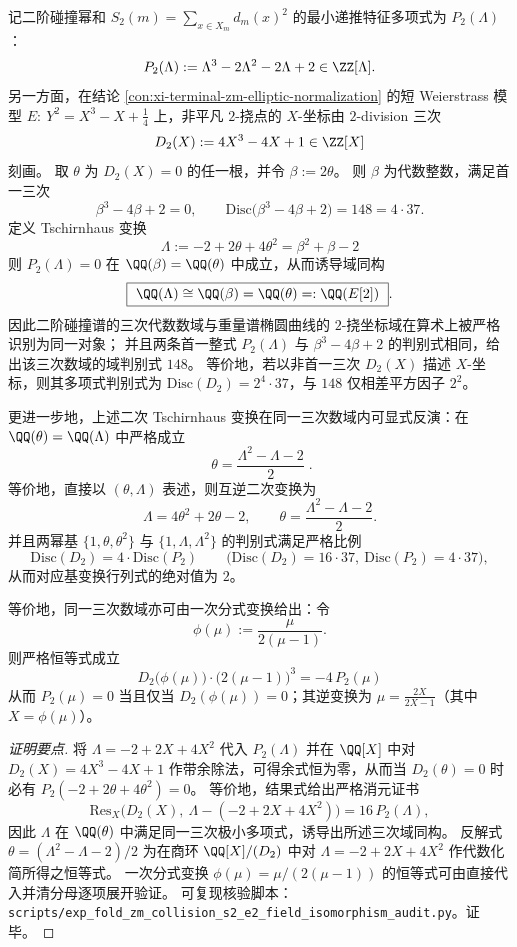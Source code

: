 \begin{conclusion}\label{con:xi-terminal-zm-collision-s2-e2-field-isomorphism}
记二阶碰撞幂和 \(S_2(m)=\sum_{x\in X_m}d_m(x)^2\) 的最小递推特征多项式为 \(P_2(\Lambda)\)：
\[
P_2(\Lambda):=\Lambda^3-2\Lambda^2-2\Lambda+2\in\ZZ[\Lambda].
\]
另一方面，在结论 \ref{con:xi-terminal-zm-elliptic-normalization} 的短 Weierstrass 模型
\(
E:\ Y^2=X^3-X+\tfrac14
\)
上，非平凡 \(2\)-挠点的 \(X\)-坐标由 \(2\)-division 三次
\[
D_2(X):=4X^3-4X+1\in\ZZ[X]
\]
刻画。
取 \(\theta\) 为 \(D_2(X)=0\) 的任一根，并令 \(\beta:=2\theta\)。
则 \(\beta\) 为代数整数，满足首一三次
\[
\beta^3-4\beta+2=0,
\qquad
\mathrm{Disc}\bigl(\beta^3-4\beta+2\bigr)=148=4\cdot 37.
\]
定义 Tschirnhaus 变换
\[
\boxed{\;\Lambda:=-2+2\theta+4\theta^2=\beta^2+\beta-2\;}
\]
则 \(P_2(\Lambda)=0\) 在 \(\QQ(\beta)=\QQ(\theta)\) 中成立，从而诱导域同构
\[
\boxed{\ \QQ(\Lambda)\cong \QQ(\beta)=\QQ(\theta)=:\QQ(E[2])\ }.
\]
因此二阶碰撞谱的三次代数数域与重量谱椭圆曲线的 \(2\)-挠坐标域在算术上被严格识别为同一对象；
并且两条首一整式 \(P_2(\Lambda)\) 与 \(\beta^3-4\beta+2\) 的判别式相同，给出该三次数域的域判别式 \(148\)。
等价地，若以非首一三次 \(D_2(X)\) 描述 \(X\)-坐标，则其多项式判别式为 \(\mathrm{Disc}(D_2)=2^{4}\cdot 37\)，与 \(148\) 仅相差平方因子 \(2^{2}\)。
\par
更进一步地，上述二次 Tschirnhaus 变换在同一三次数域内可显式反演：在 \(\QQ(\theta)=\QQ(\Lambda)\) 中严格成立
\[
\boxed{\;\theta=\frac{\Lambda^{2}-\Lambda-2}{2}\; }.
\]
等价地，直接以 \((\theta,\Lambda)\) 表述，则互逆二次变换为
\[
\Lambda=4\theta^{2}+2\theta-2,
\qquad
\theta=\frac{\Lambda^{2}-\Lambda-2}{2}.
\]
并且两幂基 \(\{1,\theta,\theta^{2}\}\) 与 \(\{1,\Lambda,\Lambda^{2}\}\) 的判别式满足严格比例
\[
\mathrm{Disc}(D_2)=4\cdot \mathrm{Disc}(P_2)
\qquad
\bigl(\mathrm{Disc}(D_2)=16\cdot 37,\ \mathrm{Disc}(P_2)=4\cdot 37\bigr),
\]
从而对应基变换行列式的绝对值为 \(2\)。
\par
等价地，同一三次数域亦可由一次分式变换给出：令
\[
\phi(\mu):=\frac{\mu}{2(\mu-1)}.
\]
则严格恒等式成立
\[
\boxed{\;D_2\bigl(\phi(\mu)\bigr)\cdot\bigl(2(\mu-1)\bigr)^3=-4\,P_2(\mu)\;}
\]
从而 \(P_2(\mu)=0\) 当且仅当 \(D_2(\phi(\mu))=0\)；其逆变换为 \(\mu=\frac{2X}{2X-1}\)（其中 \(X=\phi(\mu)\)）。
\end{conclusion}
\begin{proof}[证明要点]
将 \(\Lambda=-2+2X+4X^2\) 代入 \(P_2(\Lambda)\) 并在 \(\QQ[X]\) 中对 \(D_2(X)=4X^3-4X+1\) 作带余除法，可得余式恒为零，从而当 \(D_2(\theta)=0\) 时必有 \(P_2(-2+2\theta+4\theta^2)=0\)。
等价地，结果式给出严格消元证书
\[
\mathrm{Res}_X\!\bigl(D_2(X),\ \Lambda-(-2+2X+4X^2)\bigr)=16\,P_2(\Lambda),
\]
因此 \(\Lambda\) 在 \(\QQ(\theta)\) 中满足同一三次极小多项式，诱导出所述三次域同构。
反解式 \(\theta=(\Lambda^{2}-\Lambda-2)/2\) 为在商环 \(\QQ[X]/(D_2)\) 中对 \(\Lambda=-2+2X+4X^2\) 作代数化简所得之恒等式。
一次分式变换 \(\phi(\mu)=\mu/(2(\mu-1))\) 的恒等式可由直接代入并清分母逐项展开验证。
可复现核验脚本：\texttt{scripts/exp\_fold\_zm\_collision\_s2\_e2\_field\_isomorphism\_audit.py}。证毕。
\end{proof}

